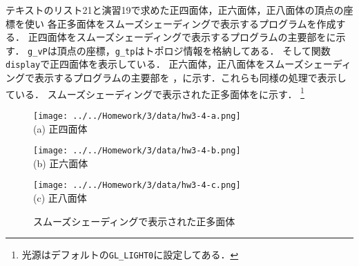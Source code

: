

テキストのリスト21と演習19で求めた正四面体，正六面体，正八面体の頂点の座標を使い
各正多面体をスムーズシェーディングで表示するプログラムを作成する．
正四面体をスムーズシェーディングで表示するプログラムの主要部をに示す．
\texttt{g\_vP}は頂点の座標，\texttt{g\_tp}はトポロジ情報を格納してある．
そして関数\texttt{display}で正四面体を表示している．
正六面体，正八面体をスムーズシェーディングで表示するプログラムの主要部を
，に示す．これらも同様の処理で表示している．
スムーズシェーディングで表示された正多面体をに示す．
\footnote{光源はデフォルトの\texttt{GL\_LIGHT0}に設定してある．}





\begin{figure}[htbp]
	\centering
	\begin{minipage}[b]{0.32\textwidth}
		\centering
		\texttt{[image: ../../Homework/3/data/hw3-4-a.png]}\\
		{\small (a) \; 正四面体}
	\end{minipage}
	\begin{minipage}[b]{0.32\textwidth}
		\centering
		\texttt{[image: ../../Homework/3/data/hw3-4-b.png]}\\
		{\small (b) \; 正六面体}
	\end{minipage}
	\begin{minipage}[b]{0.32\textwidth}
		\centering
		\texttt{[image: ../../Homework/3/data/hw3-4-c.png]}\\
		{\small (c) \; 正八面体}
	\end{minipage}
	\caption{スムーズシェーディングで表示された正多面体}
	\label{fig:hw3-4}
\end{figure}


